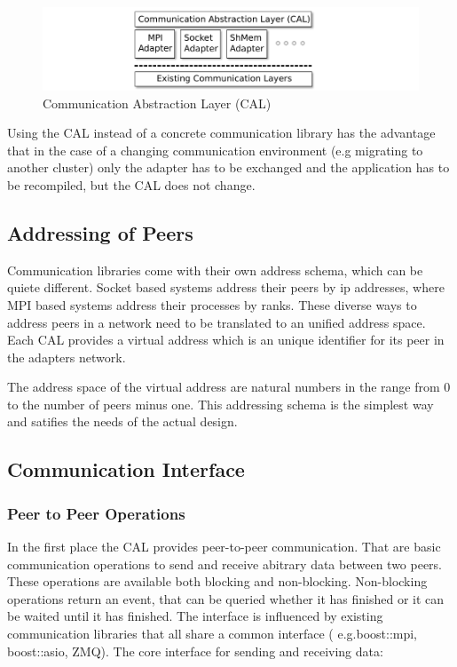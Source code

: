 \begin{figure}[H]
  \centering \includegraphics[width=\textwidth]{graphics/30_cal}
  \caption{Communication Abstraction Layer (CAL)}
  \label{fig:cal}
\end{figure}

Using the CAL instead of a concrete communication library has the
advantage that in the case of a changing communication environment
(e.g migrating to another cluster) only the adapter has to be
exchanged and the application has to be recompiled, but the CAL does
not change.

\subsection{Addressing of Peers}
Communication libraries come with their own address schema, which can
be quiete different. Socket based systems address their peers by ip
addresses, where MPI based systems address their processes by ranks.
These diverse ways to address peers in a network need to be translated
to an unified address space. Each CAL provides a virtual address
which is an unique identifier for its peer in the adapters network.

The address space of the virtual address are natural numbers in 
the range from 0 to the number of peers minus one. This addressing
schema is the simplest way and satifies the needs of the actual design.

\subsection{Communication Interface}

\subsubsection{Peer to Peer Operations}
In the first place the CAL provides peer-to-peer communication. That
are basic communication operations to send and receive abitrary data
between two peers. These operations are available both blocking and
non-blocking. Non-blocking operations return an event, that can be
queried whether it has finished or it can be waited until it has
finished. The interface is influenced by existing communication
libraries that all share a common interface ( e.g.boost::mpi,
boost::asio, ZMQ). The core interface for sending and receiving data:

